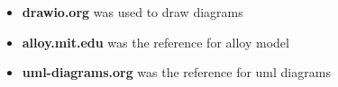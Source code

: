 \clearpage
{}


\begin{itemize}
	\item \textbf{drawio.org} was used to draw diagrams
	\item \textbf{alloy.mit.edu} was the reference for alloy model
	\item \textbf{uml-diagrams.org} was the reference for uml diagrams
\end{itemize}





